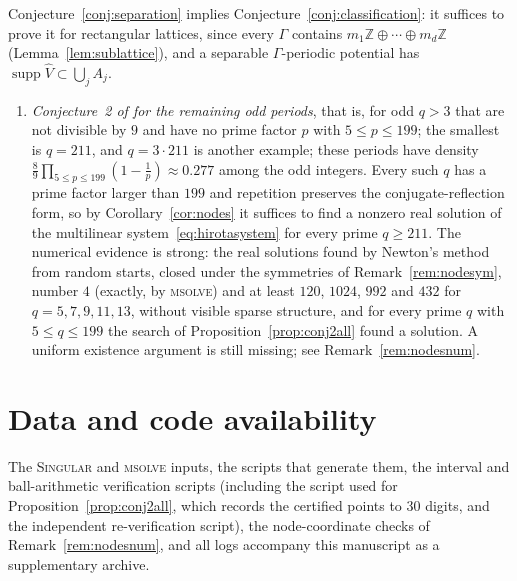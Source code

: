 \documentclass[11pt,reqno]{amsart}
\theoremstyle{definition}
\theoremstyle{remark}
\newcommand{\Z}{\mathbb Z}
\DeclareMathOperator{\supp}{supp}
\begin{document}
Conjecture~\ref{conj:separation} implies Conjecture~\ref{conj:classification}:
it suffices to prove it for rectangular lattices, since every $\Gamma$ contains
$m_1\Z\oplus\cdots\oplus m_d\Z$ (Lemma~\ref{lem:sublattice}), and a separable
$\Gamma$-periodic potential has $\supp\widehat V\subset\bigcup_jA_j$.
\begin{enumerate}[label=(\arabic*),resume]
\item \emph{Conjecture~2 of \cite{FFORS2026} for the remaining odd periods}, that is,
for odd $q>3$ that are not divisible by $9$ and have no prime factor $p$ with
$5\le p\le 199$; the smallest is $q=211$, and $q=3\cdot 211$ is another
example; these periods have density
$\frac89\prod_{5\le p\le 199}(1-\frac1p)\approx 0.277$ among the odd integers.
Every such $q$ has a prime factor larger than $199$ and repetition
preserves the conjugate-reflection form, so by Corollary~\ref{cor:nodes} it
suffices to find a nonzero real solution of the multilinear
system~\eqref{eq:hirotasystem} for every prime $q\ge 211$.  The numerical
evidence is strong: the real solutions found by Newton's method from random
starts, closed under the symmetries of Remark~\ref{rem:nodesym}, number $4$
(exactly, by \textsc{msolve}) and at least $120$, $1024$, $992$ and $432$ for
$q=5,7,9,11,13$, without visible sparse structure, and for every prime $q$
with $5\le q\le 199$ the search of Proposition~\ref{prop:conj2all} found a
solution.
A uniform existence argument is still missing; see Remark~\ref{rem:nodesnum}.
\end{enumerate}

\section*{Data and code availability}
The \textsc{Singular} and \textsc{msolve} inputs, the scripts that generate
them, the interval and ball-arithmetic verification scripts (including the
script used for Proposition~\ref{prop:conj2all}, which records the certified
points to $30$ digits, and the independent re-verification script), the
node-coordinate checks of Remark~\ref{rem:nodesnum}, and all logs accompany
this manuscript as a supplementary archive.
\end{document}
